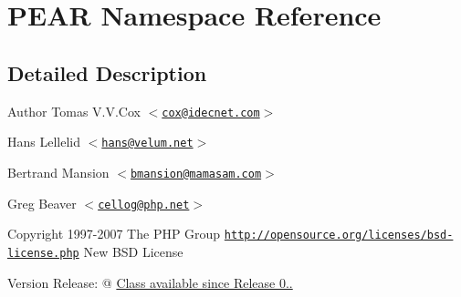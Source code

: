 \hypertarget{namespace_p_e_a_r}{
\section{\-P\-E\-A\-R \-Namespace \-Reference}
\label{namespace_p_e_a_r}
}


\subsection{\-Detailed \-Description}
\begin{DoxyAuthor}{\-Author}
\-Tomas \-V.\-V.\-Cox $<$\href{mailto:cox@idecnet.com}{\tt cox@idecnet.\-com}$>$ 

\-Hans \-Lellelid $<$\href{mailto:hans@velum.net}{\tt hans@velum.\-net}$>$ 

\-Bertrand \-Mansion $<$\href{mailto:bmansion@mamasam.com}{\tt bmansion@mamasam.\-com}$>$ 

\-Greg \-Beaver $<$\href{mailto:cellog@php.net}{\tt cellog@php.\-net}$>$ 
\end{DoxyAuthor}
\begin{DoxyCopyright}{\-Copyright}
1997-\/2007 \-The \-P\-H\-P \-Group  \href{http://opensource.org/licenses/bsd-license.php}{\tt http\-://opensource.\-org/licenses/bsd-\/license.\-php} \-New \-B\-S\-D \-License 
\end{DoxyCopyright}
\begin{DoxyVersion}{\-Version}
\-Release\-: @ \hyperlink{}{\-Class available since \-Release 0.. }
\end{DoxyVersion}

